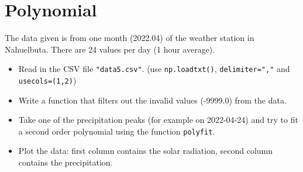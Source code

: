 \section{Polynomial}

The data given is from one month (2022.04) of the weather station in Nahuelbuta.
There are 24 values per day (1 hour average).

\begin{itemize}
    \item Read in the CSV file \verb|"data5.csv"|. (use \verb|np.loadtxt()|, \verb|delimiter=","| and \verb|usecols=(1,2)|)
    \item Write a function that filters out the invalid values (-9999.0) from the data.
    \item Take one of the precipitation peaks (for example on 2022-04-24) and try to fit a second order polynomial using the function \verb|polyfit|.
    \item Plot the data: first column contains the solar radiation, second column contains the precipitation.
\end{itemize}
